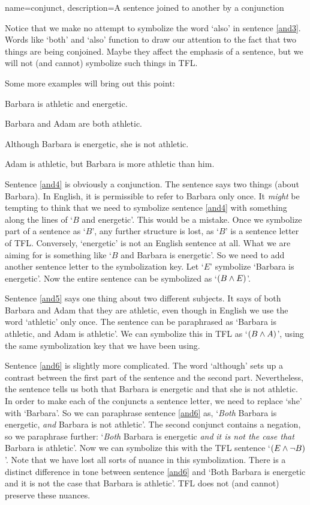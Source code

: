 {
name=conjunct,
description={A sentence joined to another by a \gls{conjunction}}
}


Notice that we make no attempt to symbolize the word `also' in sentence \ref{and3}. Words like `both' and `also' function to draw our attention to the fact that two things are being conjoined. Maybe they affect the emphasis of a sentence, but we will not (and cannot) symbolize such things in TFL.

Some more examples will bring out this point:
	\begin{earg}
		\item[\ex{and4}]Barbara is athletic and energetic.
		\item[\ex{and5}]Barbara and Adam are both athletic.
		\item[\ex{and6}]Although Barbara is energetic, she is not athletic.
	\item[\ex{and7}]Adam is athletic, but Barbara is more athletic than him.
	\end{earg}
Sentence \ref{and4} is obviously a conjunction. The sentence says two things (about Barbara). In English, it is permissible to refer to Barbara only once. It \emph{might} be tempting to think that we need to symbolize sentence \ref{and4} with something along the lines of `$B$ and energetic'. This would be a mistake. Once we symbolize part of a sentence as `$B$', any further structure is lost, as `$B$' is a sentence letter of TFL. Conversely, `energetic' is not an English sentence at all. What we are aiming for is something like `$B$ and Barbara is energetic'. So we need to add another sentence letter to the symbolization key. Let `$E$' symbolize `Barbara is energetic'. Now the entire sentence can be symbolized as `$(B\wedge E)$'.

Sentence \ref{and5} says one thing about two different subjects. It says of both Barbara and Adam that they are athletic, even though in English we use the word `athletic' only once. The sentence can be paraphrased as `Barbara is athletic, and Adam is athletic'. We can symbolize this in TFL as `$(B\wedge A)$', using the same symbolization key that we have been using.

Sentence \ref{and6} is slightly more complicated. The word `although' sets up a contrast between the first part of the sentence and the second part. Nevertheless, the sentence tells us both that Barbara is energetic and that she is not athletic. In order to make each of the conjuncts a sentence letter, we need to replace `she' with `Barbara'. So we can paraphrase sentence \ref{and6} as, `\emph{Both} Barbara is energetic, \emph{and} Barbara is not athletic'. The second conjunct contains a negation, so we paraphrase further: `\emph{Both} Barbara is energetic \emph{and} \emph{it is not the case that} Barbara is athletic'. Now we can symbolize this with the TFL sentence `$(E\wedge\neg B)$'. Note that we have lost all sorts of nuance in this symbolization. There is a distinct difference in tone between sentence \ref{and6} and `Both Barbara is energetic and it is not the case that Barbara is athletic'. TFL does not (and cannot) preserve these nuances.

